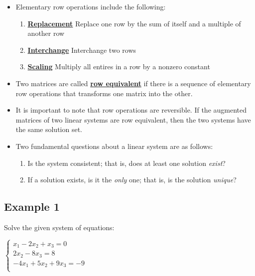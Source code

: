 \documentclass{article}
\newcommand{\definition}[1]{\underline{\textbf{#1}}}
\begin{document}
\begin{itemize}
\begin{center}
\begin{tabular}{c c c}
        \end{tabular}
    \end{center}

    \item Elementary row operations include the following: 
    \begin{enumerate}
        \item \definition{Replacement} Replace one row by the sum of itself and a multiple of another row
        \item \definition{Interchange} Interchange two rows
        \item \definition{Scaling} Multiply all entires in a row by a nonzero constant
    \end{enumerate}

    \item Two matrices are called \definition{row equivalent} if there is a sequence of elementary row operations that transforms one matrix into the other.

    \item It is important to note that row operations are reversible. If the augmented matrices of two linear systems are row equivalent, then the two systems have the same solution set.

    \item Two fundamental questions about a linear system are as follows:
    \begin{enumerate}
        \item Is the system consistent; that is, does at least one solution \textit{exist}?
        \item If a solution exists, is it the \textit{only} one; that is, is the solution \textit{unique}?
    \end{enumerate}

\end{itemize}

\pagebreak

\subsection*{Example 1}

Solve the given system of equations:

\vspace{2mm}

$\begin{cases}
x_1 - 2x_2 + x_3 = 0 \\  
2x_2 - 8x_3 = 8 \\
-4x_1 + 5x_2 + 9x_3 = -9 \\ 
\end{cases}$
\end{document}
